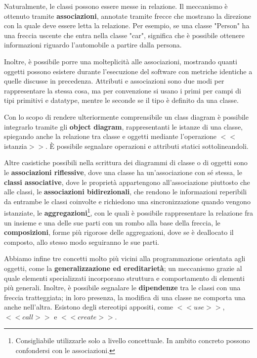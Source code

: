 \noindent Naturalmente, le classi possono essere messe in relazione. Il meccanismo è ottenuto tramite \textbf{associazioni}, annotate tramite frecce
che mostrano la direzione con la quale deve essere letta la relazione. Per esempio, se una classe "Person" ha una freccia uscente che entra nella
classe "car", significa che è possibile ottenere informazioni riguardo l'automobile a partire dalla persona.\par
Inoltre, è possibile porre una molteplicità alle associazioni, mostrando quanti oggetti possono esistere durante l'esecuzione del software con metriche
identiche a quelle discusse in precedenza. Attributi e associazioni sono due modi per rappresentare la stessa cosa, ma per convenzione si usano i primi
per campi di tipi primitivi e datatype, mentre le seconde se il tipo è definito da una classe.\par
Con lo scopo di rendere ulteriormente comprensibile un class diagram è possibile integrarlo tramite gli \textbf{object diagram}, rappresentanti le
istanze di una classe, spiegando anche la relazione tra classe e oggetti mediante l'operazione $<<$istanzia$>>$. È possibile segnalare operazioni e
attributi statici sottolineandoli.\par
Altre casistiche possibili nella scrittura dei diagrammi di classe o di oggetti sono le \textbf{associazioni riflessive}, dove una classe ha
un'associazione con sé stessa, le \textbf{classi associative}, dove le proprietà appartengono all'associazione piuttosto che alle classi, le \textbf{
associazioni bidirezionali}, che rendono le informazioni reperibili da entrambe le classi coinvolte e richiedono una sincronizzazione quando vengono
istanziate, le \textbf{aggregazioni}\footnote{Consigliabile utilizzarle solo a livello concettuale. In ambito concreto possono confondersi con le
associazioni.}, con le quali è possibile rappresentare la relazione fra un insieme e una delle sue parti con un rombo alla base della freccia, le
\textbf{composizioni}, forme più rigorose delle aggregazioni, dove se è deallocato il composto, allo stesso modo seguiranno le sue parti.\par
Abbiamo infine tre concetti molto più vicini alla programmazione orientata agli oggetti, come la \textbf{generalizzazione ed ereditarietà}; un
meccanismo grazie al quale elementi specializzati incorporano struttura e comportamento di elementi più generali. Inoltre, è possibile segnalare le
\textbf{dipendenze} tra le classi con una freccia tratteggiata; in loro presenza, la modifica di una classe ne comporta una anche nell'altra. Esistono
degli stereotipi appositi, come $<<use>>$, $<<call>>$ e $<<create>>$.


